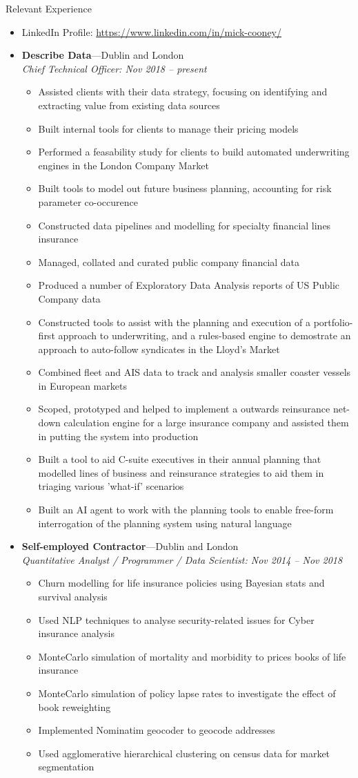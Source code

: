 \documentclass[11pt,a4paper,oneside]{article}
\newenvironment{ressection}[1]{
  \vspace{4pt}
  {\Large#1}
  \begin{itemize}
    \vspace{3pt}
}{
  \end{itemize}
}
\newcommand{\ressubitem}[1]{
  \vspace{-1pt}
  \item \begin{flushleft} #1 \end{flushleft}
}
\newcommand{\resbigitem}[3]{
  \vspace{-5pt}
  \item
  \textbf{#1}---#2 \\
  \textit{#3}
}
\newenvironment{ressubsec}[3]{
  \resbigitem{#1}{#2}{#3}
  \vspace{-2pt}
  \begin{itemize}
}{
  \end{itemize}
}
\begin{document}
\begin{ressection}{Relevant Experience}

  \item[] \hspace*{-\leftmargin} LinkedIn Profile: \href{https://www.linkedin.com/in/mick-cooney/}{https://www.linkedin.com/in/mick-cooney/}
  \vspace{2pt}


  \begin{ressubsec}{Describe Data}{Dublin and London}{Chief Technical Officer: Nov 2018 -- present}
    \ressubitem{Assisted clients with their data strategy, focusing on identifying and extracting value from existing data sources}
    \ressubitem{Built internal tools for clients to manage their pricing models}
    \ressubitem{Performed a feasability study for clients to build automated underwriting engines in the London Company Market}
    \ressubitem{Built tools to model out future business planning, accounting for risk parameter co-occurence}
    \ressubitem{Constructed data pipelines and modelling for specialty financial lines insurance}
    \ressubitem{Managed, collated and curated public company financial data}
    \ressubitem{Produced a number of Exploratory Data Analysis reports of US Public Company data}
    \ressubitem{Constructed tools to assist with the planning and execution of a portfolio-first approach to underwriting, and a rules-based engine to demostrate an approach to auto-follow syndicates in the Lloyd's Market}
    \ressubitem{Combined fleet and AIS data to track and analysis smaller coaster vessels in European markets}
    \ressubitem{Scoped, prototyped and helped to implement a outwards reinsurance net-down calculation engine for a large insurance company and assisted them in putting the system into production}
    \ressubitem{Built a tool to aid C-suite executives in their annual planning that modelled lines of business and reinsurance strategies to aid them in triaging various 'what-if' scenarios}
    \ressubitem{Built an AI agent to work with the planning tools to enable free-form interrogation of the planning system using natural language}
  \end{ressubsec}

  \begin{ressubsec}{Self-employed Contractor}{Dublin and London}{Quantitative Analyst / Programmer / Data Scientist: Nov 2014 -- Nov 2018}
    \ressubitem{Churn modelling for life insurance policies using Bayesian stats and survival analysis}
    \ressubitem{Used NLP techniques to analyse security-related issues for Cyber insurance analysis}
    \ressubitem{MonteCarlo simulation of mortality and morbidity to prices books of life insurance}
    \ressubitem{MonteCarlo simulation of policy lapse rates to investigate the effect of book reweighting}
    \ressubitem{Implemented Nominatim geocoder to geocode addresses}
    \ressubitem{Used agglomerative hierarchical clustering on census data for market segmentation}
  \end{ressubsec}


\end{ressection}
\end{document}
